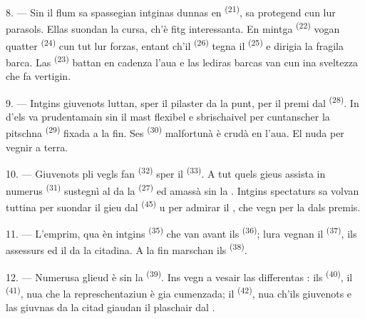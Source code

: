 \VUsaut{4.4mm}
\VUsaut{3.4mm}

8. --- Sin il flum sa spassegian intginas dunnas en 
\textsuperscript{(21)}, sa protegend cun lur parasols. Ellas suondan la cursa, ch'è
fitg interessanta. En mintga  \textsuperscript{(22)} vogan quatter
 \textsuperscript{(24)} cun tut lur forzas, entant ch'il
 \textsuperscript{(26)} tegna il 
\textsuperscript{(25)} e dirigia la fragila barca. Las 
\textsuperscript{(23)} battan en cadenza l'aua e las lediras barcas van cun ina
sveltezza che fa vertigin.

9. --- Intgins giuvenots luttan, sper il pilaster da la punt, per il premi dal
 \textsuperscript{(28)}. In d'els va prudentamain sin il mast
flexibel e sbrischaivel per cuntanscher la pitschna 
\textsuperscript{(29)} fixada a la fin. Ses 
\textsuperscript{(30)} malfortunà è crudà en l'aua. El nuda per vegnir a terra.

10. --- Giuvenots pli vegls fan  \textsuperscript{(32)}
sper il  \textsuperscript{(33)}. A tut quels gieus assista in numerus
 \textsuperscript{(31)} sustegnì al  da la
 \textsuperscript{(27)} ed amassà sin la . Intgins
spectaturs sa volvan tuttina per suondar il gieu dal 
\textsuperscript{(45)} u per admirar il , che vegn per la
 dals premis.

11. --- L'emprim, qua èn intgins  \textsuperscript{(35)} che van avant
ils  \textsuperscript{(36)}; lura vegnan il 
\textsuperscript{(37)}, ils assessurs ed il  da la
citadina. A la fin marschan ils  \textsuperscript{(38)}.

\VUsaut{5.0mm}
\VUsaut{3.6mm}

12. --- Numerusa glieud è sin la  \textsuperscript{(39)}. Ins
vegn a vesair las differentas : ils 
\textsuperscript{(40)}, il  \textsuperscript{(41)}, nua che la
represchentaziun è gia cumenzada; il  \textsuperscript{(42)}, nua
ch'ils giuvenots e las giuvnas da la citad giaudan il plaschair dal
.

